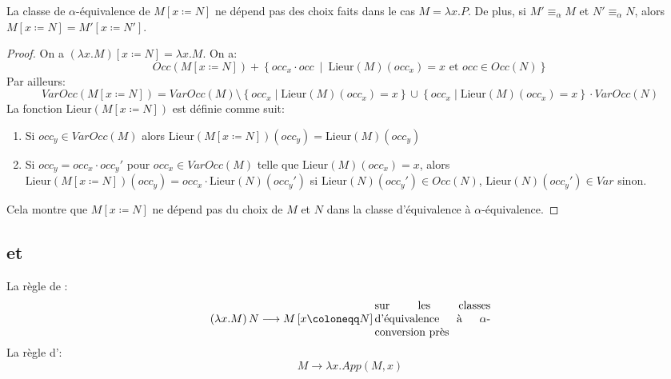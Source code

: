\documentclass[math, info]{cours}
\def\walrus{\coloneqq}
\newcommand{\sub}[3]{#1\left[#2\walrus #3\right]}
\begin{document}
\begin{proposition}
	La classe de $\alpha$-équivalence de $\sub{M}{x}{N}$ ne dépend pas des choix faits dans le cas $M = \lambda x. P$.
	De plus, si $M' \equiv_{\alpha} M$ et $N' \equiv_{\alpha} N$, alors $\sub{M}{x}{N} = \sub{M'}{x}{N'}$.
	\label{prop:classesubstitution}
\end{proposition}
\begin{proof}
	On a $\sub{\left(\lambda x. M\right)}{x}{N} = \lambda x. M$.
	On a:
	\begin{equation*}
		Occ(\sub{M}{x}{N}) + \left\{occ_{x} \cdot occ\ \middle|\ \mathrm{Lieur}(M)(occ_{x}) = x \text{ et } occ\in Occ(N)\right\}
	\end{equation*}
	Par ailleurs:
	\begin{equation*}
		VarOcc(\sub{M}{x}{N}) = VarOcc(M) \setminus \left\{occ_{x} \mid \mathrm{Lieur}(M)(occ_{x}) = x \right\} \cup \left\{occ_{x} \mid \mathrm{Lieur}(M)(occ_{x}) = x\right\}\cdot VarOcc(N)
	\end{equation*}
	La fonction $\mathrm{Lieur}\left(\sub{M}{x}{N}\right)$ est définie comme suit:
	\begin{enumerate}
		\item Si $occ_{y} \in VarOcc(M)$ alors $\mathrm{Lieur}\left(\sub{M}{x}{N} \right)(occ_{y}) = \mathrm{Lieur}(M)(occ_{y})$
		\item Si $occ_{y} = occ_{x} \cdot occ_{y}'$ pour $occ_{x} \in VarOcc(M)$ telle que $\mathrm{Lieur}(M)(occ_{x}) = x$, alors $\mathrm{Lieur}\left(\sub{M}{x}{N}\right)(occ_{y}) = occ_{x}\cdot \mathrm{Lieur}(N)(occ_{y}')$ si $\mathrm{Lieur}(N)(occ_{y}') \in Occ(N)$, $\mathrm{Lieur}(N)(occ_{y}') \in Var$ sinon.
	\end{enumerate}
	Cela montre que $\sub{M}{x}{N}$ ne dépend pas du choix de $M$ et $N$ dans la classe d'équivalence à $\alpha$-équivalence.
\end{proof}

\subsection[Betared et Etaexp]{\betared et \etaexp}
\begin{definition}
	La règle de \betared:
	\begin{equation*}
		\left(\lambda x.M \right) N \longrightarrow \sub{M}{x}{N} \text{\parbox{.3\textwidth}{sur les classes d'équivalence à $\alpha$-conversion près}}
	\end{equation*}
	La règle d'\etaexp:
	\begin{equation*}
		M \longrightarrow \lambda x. App(M, x)
	\end{equation*}
	\label{def:betaredetaexp}
\end{definition}
\end{document}
